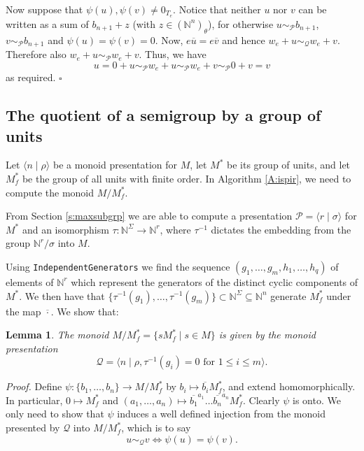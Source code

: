 \documentclass{acmconf}
\newtheorem{lemma}{Lemma}
\begin{document}
Now suppose that $\psi(u),\psi(v)\neq 0_{T_e}$. 
Notice that neither $u$ nor $v$ can be written as a sum of
$b_{n+1}+z$ (with $z\in(\mathbb{N}^n)_{\theta}$), for otherwise
$u\sim_{\mathcal{P}}b_{n+1}$, $v\sim_{\mathcal{P}}b_{n+1}$
and $\psi(u)=\psi(v)=0$.
Now, $e\overline{u}=e\overline{v}$ and hence 
$w_e+u\sim_{\mathcal{Q}}w_e+v$.
Therefore also $w_e+u\sim_{\mathcal{P}}w_e+v$.
Thus, we have
$$u=0+u\sim_{\mathcal{P}}w_e+u\sim_{\mathcal{P}}
w_e+v\sim_{\mathcal{P}}0+v=v$$
as required.  $\square$


\subsection{The quotient of a semigroup by a group of units}\label{s:unitquo}

Let $\langle n \mid \rho \rangle$ be a monoid presentation for $M$,
let $M^*$ be its group of units, and let $M^*_f$ be the group of all units
with finite order. In Algorithm \ref{A:ispir}, we need to compute the
monoid $M/M^*_f$.

From Section \ref{s:maxsubgrp} we are able to compute a presentation
$\mathcal{P} = \langle r \mid \sigma \rangle $ for $M^*$ and an isomorphism 
$\tau: \mathbb{N}^\Sigma \rightarrow \mathbb{N}^r$, where 
$\tau^{-1}$ dictates the embedding from the group $\mathbb{N}^r/\sigma$ 
into $M$.

Using {\tt IndependentGenerators}  we find the sequence
$(g_1, \ldots, g_m, h_1, \ldots, h_q)$ of elements of 
$\mathbb{N}^r$ which represent the generators of the distinct
cyclic components of $M^*$. We then have that 
$\{\tau^{-1}(g_1), \ldots, \tau^{-1}(g_m)\} \subset \mathbb{N}^\Sigma \subseteq
\mathbb{N}^n$ generate $M^*_f$ under the map $\overline{\cdot}$.
We show that:
\begin{lemma}\label{t:mgpres}
The monoid $M/M^*_f = \{sM^*_f \mid s \in M\}$ 
is given by the monoid presentation
$$\mathcal{Q} = \langle n \mid 
\rho, \tau^{-1}(g_i) = 0 \mbox{ for $1 \leq i \leq m$}\rangle.$$
\end{lemma}
\emph{Proof.}
Define $\psi : \{b_1, \ldots, b_n\}  \rightarrow M/M^*_f$ by
$b_i \mapsto \overline{b_i} M^*_f$, and extend homomorphically. 
In particular, $0 \mapsto M^*_f$ and
$(a_1, \ldots, a_n) \mapsto 
\overline{b_1}^{a_1} \ldots \overline{b_n}^{a_n} M^*_f$.
Clearly $\psi$ is onto.
We only need to show that $\psi$ induces a well defined injection from
the monoid presented by $\mathcal{Q}$ into $M/M^*_f$, which is to say
$$u \sim_\mathcal{Q} v \Leftrightarrow \psi(u) = \psi(v).$$
\end{document}
